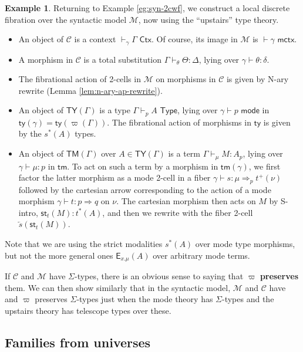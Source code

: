 \documentclass[10pt]{article}
\theoremstyle{definition}
\newtheorem{example}{Example}
\newcommand{\yields}{\vdash}
\newcommand{\tcell}{\Rightarrow}
\newcommand{\CTX}{\,\,\mathsf{Ctx}}
\newcommand{\ctx}{\,\,\mathsf{mctx}}
\newcommand{\TYPE}{\,\,\mathsf{Type}}
\newcommand{\type}{\,\,\mathsf{mode}}
\newcommand{\rewrite}[2]{\overleftarrow{#1}(#2)}
\newcommand\E[2]{\ensuremath{\mathsf{E}_{#1}(#2)}}
\newcommand\St[2]{\ensuremath{{#1}^*(#2)}}
\newcommand\StI[2]{\ensuremath{\mathsf{st}_{#1}(#2)}}
\newcommand\TypeTwo[4]{\ensuremath{#1 \vdash #2 :  #3 \tcell #4}}
\newcommand\TermTwoT[5]{\ensuremath{#1 \vdash {#2} : #3 \tcell_{#5} #4}}
\newcommand\TrPlus[2]{\ensuremath{{#1}^+(#2)}}
\newcommand\M{\mathcal{M}}
\newcommand\Mty{\mathsf{ty}}
\newcommand\Mtm{\mathsf{tm}}
\newcommand\C{\mathcal{C}}
\newcommand\Cty{\mathsf{TY}}
\newcommand\Ctm{\mathsf{TM}}
\newcommand\vp{\varpi}
\begin{document}
\begin{example}\label{eg:syn-fib-2cwf}
  Returning to Example \ref{eg:syn-2cwf}, we construct a local discrete fibration over the syntactic model $\M$, now using the ``upstairs'' type theory.
  \begin{itemize}
  \item An object of $\C$ is a context $\yields_\gamma \Gamma \CTX$.
    Of course, its image in $\M$ is $\yields \gamma \ctx$.
  \item A morphism in $\C$ is a total substitution $\Gamma \yields_\theta \Theta : \Delta$, lying over $\gamma \yields \theta : \delta$.
  \item The fibrational action of 2-cells in $\M$ on morphisms in $\C$ is given by N-ary rewrite (Lemma \ref{lem:n-ary-ap-rewrite}).
  \item An object of $\Cty(\Gamma)$ is a type $\Gamma \yields_p A \TYPE$, lying over $\gamma \yields p\type$ in $\Mty(\gamma) = \Mty(\vp(\Gamma))$.
    The fibrational action of morphisms in $\Mty$ is given by the $\St{s}{A}$ types.
  \item An object of $\Ctm(\Gamma)$ over $A\in \Cty(\Gamma)$ is a term $\Gamma \yields_\mu M:A_p$, lying over $\gamma \yields \mu:p$ in $\Mtm$.
    To act on such a term by a morphism in $\Mtm(\gamma)$, we first factor the latter morphism as a mode 2-cell in a fiber $\TermTwoT{\gamma}{s}{\mu}{\TrPlus{t}{\nu}}{p}$ followed by the cartesian arrow corresponding to the action of a mode morphism $\TypeTwo{\gamma}{t}{p}{q}$ on $\nu$.
    The cartesian morphism then acts on $M$ by S-intro, $\StI{t}{M} : \St{t}{A}$, and then we rewrite with the fiber 2-cell $\rewrite{s}{\StI{t}{M}}$.
  \end{itemize}
\end{example}

Note that we are using the strict modalities $\St{s}{A}$ over mode type morphisms, but not the more general ones $\E{x.\mu}{A}$ over arbitrary mode terms.

If $\C$ and $\M$ have $\Sigma$-types, there is an obvious sense to saying that $\vp$ \textbf{preserves} them.
We can then show similarly that in the syntactic model, $\M$ and $\C$ have and $\vp$ preserves $\Sigma$-types just when the mode theory has $\Sigma$-types and the upstairs theory has telescope types over these.


\subsection{Families from universes}
\label{sec:2cwf-univ}
\end{document}

